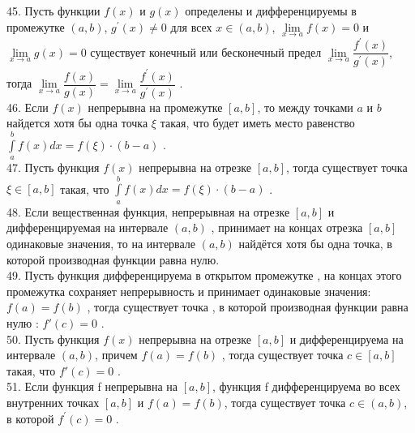 \documentclass[12pt]{article}
\begin{document}
45. Пусть функции ${\displaystyle f(x)}$ и ${\displaystyle g(x)}$ определены и дифференцируемы в промежутке ${\displaystyle (a,b)}$, ${\displaystyle g^{\prime}(x) \neq 0}$ для всех ${\displaystyle x\in (a,b)}$, ${\displaystyle \lim \limits _{x \to a} f(x)=0}$ и ${\displaystyle \lim \limits _{x \to a} g(x)=0}$  существует конечный или бесконечный предел ${\displaystyle \lim \limits _{x \to a} \dfrac{f^{\prime}(x)}{g^{\prime}(x)}}$, тогда ${\displaystyle \lim \limits _{x \to a}\dfrac{f(x)}{g(x)}=\lim \limits _{x \to a} \dfrac{f^{\prime}(x)}{g^{\prime}(x)}}$ .\\

46. Если ${\displaystyle f(x)}$ непрерывна на промежутке ${\displaystyle [a,b]}$, то между точками ${\displaystyle a}$ и ${\displaystyle b}$ найдется хотя бы одна точка  ${\displaystyle \xi}$ такая, что будет иметь место равенство ${\displaystyle \int \limits _{a}^{b} f(x) dx=f(\xi)\cdot (b-a)}$ .\\

47. Пусть функция ${\displaystyle f(x)}$ непрерывна на отрезке ${\displaystyle [a,b]}$, тогда существует точка ${\displaystyle \xi \in [a,b]}$ такая, что ${\displaystyle \int \limits _{a}^{b} f(x) dx=f(\xi)\cdot (b-a)}$ .\\

48. Если вещественная функция, непрерывная на отрезке ${\displaystyle [a,b]}$ и дифференцируемая на интервале ${\displaystyle (a,b)}$ , принимает на концах отрезка ${\displaystyle [a,b]}$ одинаковые значения, то на интервале ${\displaystyle (a,b)}$ найдётся хотя бы одна точка, в которой производная функции равна нулю.\\

49. Пусть функция  дифференцируема в открытом промежутке , на концах этого промежутка сохраняет непрерывность и принимает одинаковые значения: ${\displaystyle f(a)=f(b)}$ , тогда существует точка  , в которой производная функции  равна нулю : ${\displaystyle f'(c)=0}$  .\\

50. Пусть функция ${\displaystyle f(x)}$ непрерывна на отрезке ${\displaystyle [a,b]}$ и дифференцируема на интервале ${\displaystyle (a,b)}$, причем ${\displaystyle f(a)=f(b)}$ , тогда существует точка ${\displaystyle c \in [a, b]}$ такая, что ${\displaystyle f'(c)=0}$ .\\

51. Если функция f непрерывна на ${\displaystyle [a,b]}$, функция f дифференцируема во всех внутренних точках ${\displaystyle [a,b]}$ и ${\displaystyle f(a)=f(b)}$, тогда существует точка ${\displaystyle c\in (a,b)}$, в которой ${\displaystyle f^{\prime}(c)=0}$ .\\
\end{document}
